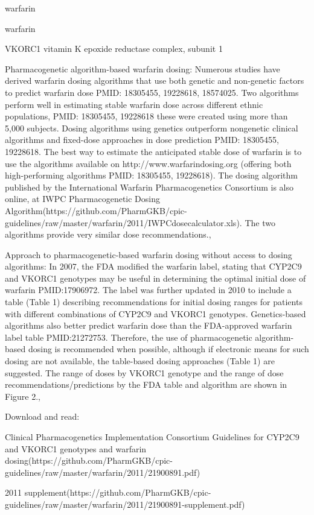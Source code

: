\documentclass{resume} %
\begin{document}
\begin{rSection}{ warfarin }
\begin{rSection}{ warfarin }
\begin{rSubsection}{ VKORC1 }{ vitamin K epoxide reductase complex, subunit 1 }{}{}
\item Pharmacogenetic algorithm-based warfarin dosing: Numerous studies have derived warfarin dosing algorithms that use both genetic and non-genetic factors to predict warfarin dose PMID: 18305455, 19228618, 18574025. Two algorithms perform well in estimating stable warfarin dose across different ethnic populations,  PMID: 18305455, 19228618 these were created using more than 5,000 subjects. Dosing algorithms using genetics outperform nongenetic clinical algorithms and fixed-dose approaches in dose prediction PMID: 18305455, 19228618. The best way to estimate the anticipated stable dose of warfarin is to use the algorithms available on http://www.warfarindosing.org (offering both high-performing algorithms PMID: 18305455, 19228618). The dosing algorithm published by the International Warfarin Pharmacogenetics Consortium is also online, at IWPC Pharmacogenetic Dosing Algorithm(https://github.com/PharmGKB/cpic-guidelines/raw/master/warfarin/2011/IWPCdosecalculator.xls). The two algorithms provide very similar dose recommendations., 
 \newline
\item Approach to pharmacogenetic-based warfarin dosing without access to dosing algorithms:     In 2007, the FDA modified the warfarin label, stating that CYP2C9 and VKORC1 genotypes may be useful in determining the optimal initial dose of warfarin PMID:17906972. The label was further updated in 2010 to include a table (Table 1) describing recommendations for initial dosing ranges for patients with different combinations of CYP2C9 and VKORC1 genotypes. Genetics-based algorithms also better predict warfarin dose than the FDA-approved warfarin label table PMID:21272753. Therefore, the use of pharmacogenetic algorithm-based dosing is recommended when possible, although if electronic means for such dosing are not available, the table-based dosing approaches (Table 1) are suggested. The range of doses by VKORC1 genotype and the range of dose recommendations/predictions by the FDA table and algorithm are shown in Figure 2., 
 \newline
\item Download and read: 
 \newline
\item Clinical Pharmacogenetics Implementation Consortium Guidelines for CYP2C9 and VKORC1 genotypes and warfarin dosing(https://github.com/PharmGKB/cpic-guidelines/raw/master/warfarin/2011/21900891.pdf)
 \newline
\item 2011 supplement(https://github.com/PharmGKB/cpic-guidelines/raw/master/warfarin/2011/21900891-supplement.pdf)

\end{rSubsection}
\end{rSection}
\end{rSection}
\end{document}
